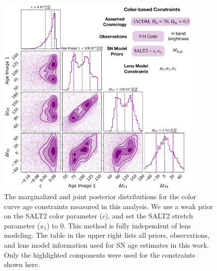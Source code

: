 \documentclass[12pt]{article}
\begin{document}
\begin{figure}
    \centering
    \includegraphics[width=0.9\textwidth]{Paper/Figures/corner_color_curve_fit_with_c_prior_labels}
    \caption{The marginalized and joint posterior distributions for the color curve age constraints measured in this analysis. We use a weak prior on the SALT2 color parameter ($c$), and set the SALT2 stretch parameter ($x_1$) to 0. This method is fully independent of lens modeling.  The table in the upper right lists all 
    priors, observations, and lens model information
    used for SN age estimates in this work.  
    Only the highlighted 
    components were used for the constraints shown here.}
    \label{fig:corner_cfit}
\end{figure}
\end{document}
